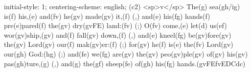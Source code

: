 initial-style: 1;
centering-scheme: english;
(c2) <sp>v</sp> The(g) sea(gh/ig) is(f) his,(e) and(fv) he(gv) made(gv) it,(f) (,) and(e) his(fg) hands(f) pre(e)pared(f) the(gv) dry(gvFE) land:(fv) (;) O(fv) come,(e) let(d) us(ef) wor(gv)ship,(gv) and(f) fall(gv) down,(f) (,) and(e) kneel(fg) be(gv)fore(gv) the(gv) Lord(gv) our(f) mak(gv)er:(f) (;) for(gv) he(f) is(e) the(fv) Lord(gv) our(gh) God:(hg) (;) and(fe) we(fg) are(gv) the(gv) peo(gv)ple(gv) of(gv) his(gv) pas(gh)ture,(g) (,) and(g) the(gf) sheep(fe) of(gh) his(fg) hands.(gvFEfvEDCdc)
